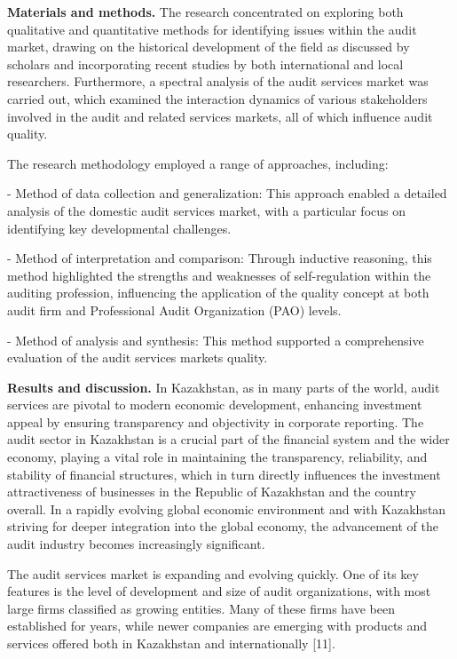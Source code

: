\begin{multicols}{2}
\textbf{Materials and methods.} The research concentrated on exploring
both qualitative and quantitative methods for identifying issues within
the audit market, drawing on the historical development of the field as
discussed by scholars and incorporating recent studies by both
international and local researchers. Furthermore, a spectral analysis of
the audit services market was carried out, which examined the
interaction dynamics of various stakeholders involved in the audit and
related services markets, all of which influence audit quality.

The research methodology employed a range of approaches, including:

- Method of data collection and generalization: This approach enabled a
detailed analysis of the domestic audit services market, with a
particular focus on identifying key developmental challenges.

- Method of interpretation and comparison: Through inductive reasoning,
this method highlighted the strengths and weaknesses of self-regulation
within the auditing profession, influencing the application of the
quality concept at both audit firm and Professional Audit Organization
(PAO) levels.

- Method of analysis and synthesis: This method supported a
comprehensive evaluation of the audit services market\textquotesingle s
quality.

\textbf{Results and discussion.} In Kazakhstan, as in many parts of the
world, audit services are pivotal to modern economic development,
enhancing investment appeal by ensuring transparency and objectivity in
corporate reporting. The audit sector in Kazakhstan is a crucial part of
the financial system and the wider economy, playing a vital role in
maintaining the transparency, reliability, and stability of financial
structures, which in turn directly influences the investment
attractiveness of businesses in the Republic of Kazakhstan and the
country overall. In a rapidly evolving global economic environment and
with Kazakhstan striving for deeper integration into the global economy,
the advancement of the audit industry becomes increasingly significant.

The audit services market is expanding and evolving quickly. One of its
key features is the level of development and size of audit
organizations, with most large firms classified as growing entities.
Many of these firms have been established for years, while newer
companies are emerging with products and services offered both in
Kazakhstan and internationally {[}11{]}.


\end{multicols}
